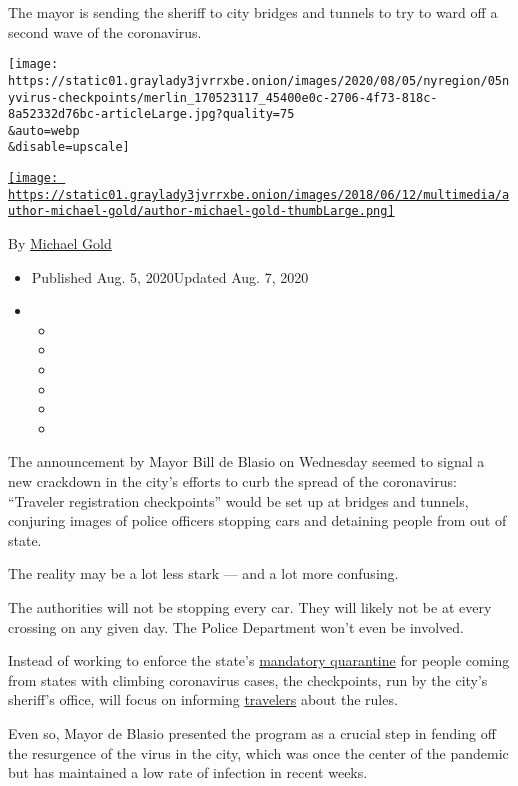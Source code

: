 The mayor is sending the sheriff to city bridges and tunnels to try to
ward off a second wave of the coronavirus.

\texttt{[image: https://static01.graylady3jvrrxbe.onion/images/2020/08/05/nyregion/05nyvirus-checkpoints/merlin\_170523117\_45400e0c-2706-4f73-818c-8a52332d76bc-articleLarge.jpg?quality=75\\\&auto=webp\\\&disable=upscale]}

\href{https://www.nytimes3xbfgragh.onion/by/michael-gold}{\texttt{[image: https://static01.graylady3jvrrxbe.onion/images/2018/06/12/multimedia/author-michael-gold/author-michael-gold-thumbLarge.png]}}

By \href{https://www.nytimes3xbfgragh.onion/by/michael-gold}{Michael
Gold}

\begin{itemize}
\item
  Published Aug. 5, 2020Updated Aug. 7, 2020
\item
  \begin{itemize}
  \item
  \item
  \item
  \item
  \item
  \item
  \end{itemize}
\end{itemize}

The announcement by Mayor Bill de Blasio on Wednesday seemed to signal a
new crackdown in the city's efforts to curb the spread of the
coronavirus: ``Traveler registration checkpoints'' would be set up at
bridges and tunnels, conjuring images of police officers stopping cars
and detaining people from out of state.

The reality may be a lot less stark --- and a lot more confusing.

The authorities will not be stopping every car. They will likely not be
at every crossing on any given day. The Police Department won't even be
involved.

Instead of working to enforce the state's
\href{https://www.nytimes3xbfgragh.onion/2020/08/16/nyregion/coronavirus-quarantine-nyc.html}{mandatory
quarantine} for people coming from states with climbing coronavirus
cases, the checkpoints, run by the city's sheriff's office, will focus
on informing
\href{https://www.nytimes3xbfgragh.onion/2020/08/07/us/california-travel-restrictions-covid-19.html}{travelers}
about the rules.

Even so, Mayor de Blasio presented the program as a crucial step in
fending off the resurgence of the virus in the city, which was once the
center of the pandemic but has maintained a low rate of infection in
recent weeks.

